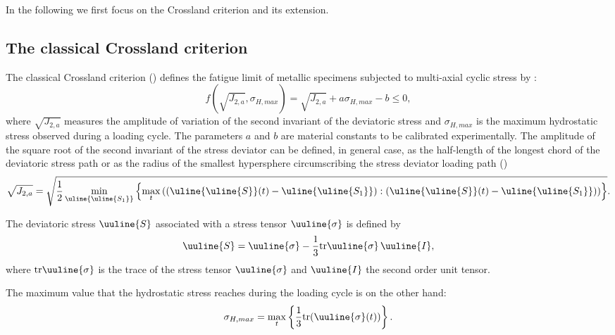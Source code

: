 In the following we first focus on the Crossland criterion and its extension.

\subsection{The classical Crossland criterion}

The classical Crossland criterion (\cite{crossland1956effect}) defines the fatigue limit of metallic specimens subjected to multi-axial cyclic stress  by : 
\begin{equation}
	f(\sqrt{J_{2,a}},\sigma_{H,max})=\sqrt{J_{2,a}}+a\sigma_{H,max}-b\leqslant 0,\label{eq:crossland}
\end{equation}
where $\sqrt{J_{2,a}}$ measures  the amplitude of variation of the second invariant of the deviatoric stress  and $\sigma_{H,max}$ is the maximum hydrostatic stress observed during a loading cycle. The parameters $a$ and $b$ are material constants to be calibrated experimentally. The amplitude of the square root of the second invariant of the stress deviator can be defined, in general case, as the half-length of the longest chord of the deviatoric stress path or as the radius of the smallest hypersphere circumscribing the stress deviator loading path (\cite{Papadopoulos1997219})
\begin{equation}\sqrt{J_{2,a}}=\sqrt{\frac{1}{2}\min \limits_{\uline{\uline{S_1}}}\left\lbrace \max \limits_{t}\left( (\uline{\uline{S}}(t)-\uline{\uline{S_1}}):(\uline{\uline{S}}(t)-\uline{\uline{S_1}})\right) \right\rbrace }.\end{equation}

The deviatoric stress $\uuline{S}$ associated with a stress tensor $\uuline{\sigma}$  is defined by
\begin{equation} \uuline{S}=\uuline{\sigma}-\dfrac{1}{3}\textrm{tr}\uuline{\sigma}\, \uuline{I},
\end{equation}
where $\textrm{tr}\uuline{\sigma}$ is the trace of the stress tensor $\uuline{\sigma}$ and $\uuline{I}$ the second order unit tensor.

The maximum value that the hydrostatic stress reaches during the loading cycle is on the other hand:
\begin{equation}
	\sigma_{H,max}=\max\limits_{t}\left\lbrace \dfrac{1}{3}\textrm{tr}(\uuline{\sigma}(t))\right\rbrace .
\end{equation}

